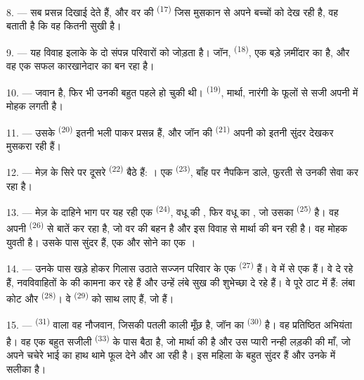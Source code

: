 \VUsaut{3.0mm}

8. --- सब प्रसन्न दिखाई देते हैं, और वर की  \textsuperscript{(17)} जिस
मुसकान से अपने बच्चों को देख रही है, वह बताती है कि वह कितनी सुखी है।

9. --- यह विवाह इलाके के दो संपन्न परिवारों को जोड़ता है। जॉन, 
\textsuperscript{(18)}, एक बड़े ज़मींदार का  है, और वह एक सफल
कारखानेदार का  बन रहा है।

10. ---  जवान है, फिर भी उनकी  बहुत पहले हो चुकी
थी।  \textsuperscript{(19)}, मार्था, नारंगी के फूलों से सजी अपनी
 में मोहक लगती है।

11. --- उसके  \textsuperscript{(20)} इतनी भली  पाकर
प्रसन्न हैं, और जॉन की  \textsuperscript{(21)} अपनी  को
इतनी सुंदर देखकर मुसकरा रही हैं।

12. --- मेज़ के सिरे पर दूसरे  \textsuperscript{(22)} बैठे हैं:
। एक 
\textsuperscript{(23)}, बाँह पर नैपकिन डाले, फुरती से उनकी सेवा कर रहा है।

\VUsaut{3.0mm}

13. --- मेज़ के दाहिने भाग पर यह रही एक  \textsuperscript{(24)},
वधू की , फिर वधू का , जो उसका
 \textsuperscript{(25)} है। वह अपनी 
\textsuperscript{(26)} से बातें कर रहा है, जो वर की बहन है और इस विवाह से मार्था
की  बन रही है। वह मोहक युवती है। उसके पास सुंदर  हैं,
एक  और सोने का एक ।

14. --- उनके पास खड़े होकर गिलास उठाते सज्जन परिवार के एक 
\textsuperscript{(27)} हैं। वे  में से एक हैं। वे
 दे रहे हैं, नवविवाहितों के  की कामना कर रहे हैं
और उन्हें लंबे सुख की शुभेच्छा दे रहे हैं। वे पूरे ठाट में हैं: लंबा कोट और
 \textsuperscript{(28)}। वे 
\textsuperscript{(29)} को साथ लाए हैं, जो  हैं।

15. ---  \textsuperscript{(31)} वाला वह नौजवान, जिसकी पतली काली
मूँछ है, जॉन का  \textsuperscript{(30)} है। वह प्रतिष्ठित अभियंता
है। वह एक बहुत सजीली  \textsuperscript{(33)} के पास बैठा है, जो
मार्था की  है और उस प्यारी नन्ही लड़की की माँ, जो अपने चचेरे
भाई का हाथ थामे फूल देने और   आ रही है। इस
महिला के  बहुत सुंदर हैं और उनके  में
सलीका है।

